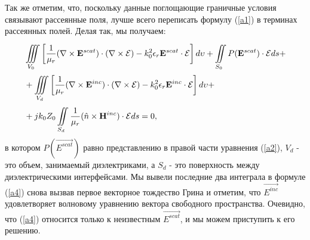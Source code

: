 Так же отметим, что, поскольку данные поглощающие граничные условия связывают рассеянные поля, лучше всего переписать формулу (\ref{a1}) в терминах рассеянных полей. Делая так, мы получаем:
\begin{align}\label{a4}
	&\iiint\limits_{V_{0}}^{} \left[ \dfrac{1}{\mu_{r}}(\nabla \times \vec{E}^{scat}) \cdot (\nabla \times \vec{\cal{E}}) - k_{0}^{2} \epsilon_{r}\vec{E}^{scat} \cdot \vec{\cal{E}} \right]d\upsilon + 
	\iint\limits_{S_{0}}^{}  P(\vec{E}^{scat}) \cdot \vec{\cal{E}}ds +\notag\\
	&+ 
	\iiint\limits_{V_{d}}^{} \left[ \dfrac{1}{\mu_{r}}(\nabla \times \vec{E}^{inc}) \cdot (\nabla \times \vec{\cal{E}}) - k_{0}^{2} \epsilon_{r}\vec{E}^{inc} \cdot \vec{\cal{E}} \right]d\upsilon +\notag\\
	&+ jk_{0}Z_{0}\iint\limits_{S_{d}}^{} \dfrac{1}{\mu_{r}}(\hat{n} \times \vec{H}^{inc}) \cdot \vec{\cal{E}}ds = 0,
\end{align}
в котором $P(\vec{E^{scat}})$ равно представлению в правой части уравнения (\ref{a2}), $ V_{d} $ - это объем, занимаемый диэлектриками, а $ S_{d} $ - это поверхность между диэлектрическими интерфейсами. Мы вывели последние два интеграла в формуле (\ref{a4}) снова вызвав первое векторное тождество Грина и отметим, что $ \vec{E^{inc}} $ удовлетворяет волновому уравнению вектора свободного пространства. Очевидно, что (\ref{a4}) относится только к неизвестным $ \vec{E^{scat}} $, и мы можем приступить к его решению.
